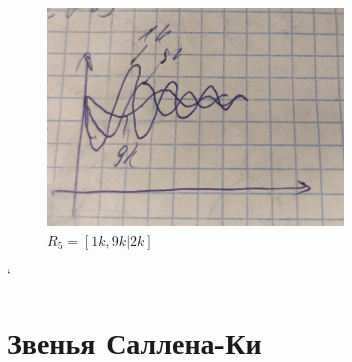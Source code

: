 \documentclass[a4paper, 12pt]{article}%
\begin{document}
\begin{enumerate}
\begin{figure}[h!]
\centering	
\includegraphics[width=0.7\textwidth]{images/2_5-2.jpg}
\caption{$R_5 = [1k, 9k|2k]$}
\label{2_5-2}
\end{figure}`

\end{enumerate}

\section{Звенья Саллена-Ки}
\end{document}
